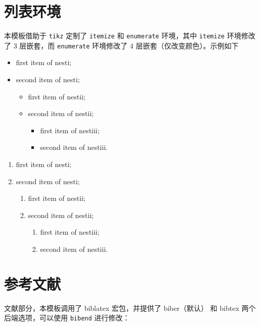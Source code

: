 \documentclass[lang=cn,10pt]{elegantbook}
\begin{document}
\section{列表环境}
本模板借助于 \lstinline{tikz} 定制了 \lstinline{itemize} 和 \lstinline{enumerate} 环境，其中 \lstinline{itemize} 环境修改了 3 层嵌套，而 \lstinline{enumerate} 环境修改了 4 层嵌套（仅改变颜色）。示例如下\\[2ex]
\begin{minipage}[b]{0.49\textwidth}
  \begin{itemize}
    \item first item of nesti;
    \item second item of nesti;
      \begin{itemize}
        \item first item of nestii;
        \item second item of nestii;
        \begin{itemize}
          \item first item of nestiii;
          \item second item of nestiii.
        \end{itemize}   
      \end{itemize}
  \end{itemize}
\end{minipage}
\begin{minipage}[b]{0.49\textwidth}
  \begin{enumerate}
    \item first item of nesti;
    \item second item of nesti;
      \begin{enumerate}
        \item first item of nestii;
        \item second item of nestii;
        \begin{enumerate}
          \item first item of nestiii;
          \item second item of nestiii.
        \end{enumerate}   
      \end{enumerate}
  \end{enumerate}
\end{minipage}

\section{参考文献}
文献部分，本模板调用了 biblatex 宏包，并提供了 biber（默认） 和 bibtex 两个后端选项，可以使用 \lstinline{bibend} 进行修改：
\end{document}
